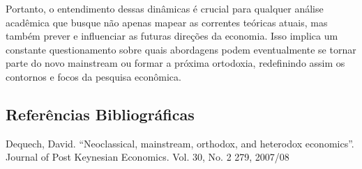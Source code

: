 \documentclass[a4paper,12pt]{article}[abntex2]
\begin{document}
Portanto, o entendimento dessas dinâmicas é crucial para qualquer análise acadêmica que busque não apenas mapear as correntes teóricas atuais, mas também prever e influenciar as futuras direções da economia. Isso implica um constante questionamento sobre quais abordagens podem eventualmente se tornar parte do novo mainstream ou formar a próxima ortodoxia, redefinindo assim os contornos e focos da pesquisa econômica.

\subsection{\textbf{Referências Bibliográficas}}
Dequech, David. “Neoclassical, mainstream, orthodox, and heterodox economics”. Journal of Post Keynesian Economics. Vol. 30, No. 2 279, 2007/08
\end{document}
